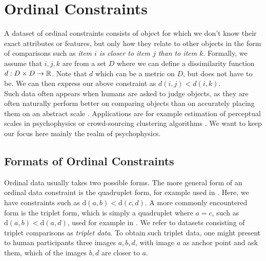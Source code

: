 
\section{Ordinal Constraints}
A dataset of ordinal constraints consists of object for which we don't know their exact attributes or features, but only how they relate to other objects
in the form of comparisons such as \textit{item $i$ is closer to item $j$ than to item $k$}. Formally, we assume that $i, j, k$ are from 
a set $D$ where we can define a dissimilarity function $d: D \times D \to \mathbb{R}$. Note that $d$ which can be a metric on $D$, but does not have to be.
We can then express our above constraint as $d(i, j) < d(i, k)$. \\

Such data often appears when humans are asked to judge objects, as they are often naturally perform better on comparing objects
than on accurately placing them on an abstract scale \cite{stewartAbsoluteIdentificationRelative2005}. Applications are for example estimation of perceptual scales in psychophysics 
\cite{haghiriEstimationPerceptualScales2019} or crowd-sourcing clustering algorithms \cite{ukkonenCrowdsourcedCorrelationClustering2017}. 
We want to keep our focus here mainly the realm of psychophysics.


\subsection{Formats of Ordinal Constraints}
Ordinal data usually takes two possible forms. 
The more general form of an ordinal data constraint is the quadruplet form, for example used in \cite{ghoshdastidarFoundationsComparisonBasedHierarchical2019}. 
Here, we have constraints such as $\text{d}(a,b) < \text{d}(c,d)$. A more commonly encountered form is the triplet form, which is simply a quadruplet where $a = c$, such as
$\text{d}(a,b) < \text{d}(a,d)$, used for example in \cite{vankadaraInsightsOrdinalEmbedding2019,haghiriComparisonBasedFrameworkPsychophysics2019}. We refer to datasets
consisting of triplet comparisons as \textit{triplet data}.
To obtain such triplet data, one might present to human participants three images $a, b, d$, with image $a$ as anchor point and ask them, which of the images $b,d$ are closer to $a$. \\


